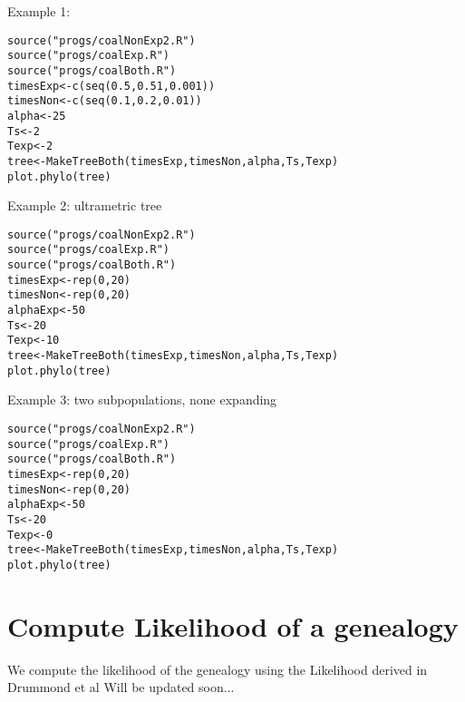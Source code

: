 \documentclass[12pt,a4paper]{article}
\begin{document}
Example 1:

\begin{verbatim}
source("progs/coalNonExp2.R")
source("progs/coalExp.R")
source("progs/coalBoth.R")
timesExp<-c(seq(0.5,0.51,0.001))
timesNon<-c(seq(0.1,0.2,0.01))
alpha<-25
Ts<-2
Texp<-2
tree<-MakeTreeBoth(timesExp,timesNon,alpha,Ts,Texp)
plot.phylo(tree)
\end{verbatim}

Example 2: ultrametric tree

\begin{verbatim}
source("progs/coalNonExp2.R")
source("progs/coalExp.R")
source("progs/coalBoth.R")
timesExp<-rep(0,20)
timesNon<-rep(0,20)
alphaExp<-50
Ts<-20
Texp<-10
tree<-MakeTreeBoth(timesExp,timesNon,alpha,Ts,Texp)
plot.phylo(tree)
\end{verbatim}

Example 3: two subpopulations, none expanding

\begin{verbatim}
source("progs/coalNonExp2.R")
source("progs/coalExp.R")
source("progs/coalBoth.R")
timesExp<-rep(0,20)
timesNon<-rep(0,20)
alphaExp<-50
Ts<-20
Texp<-0
tree<-MakeTreeBoth(timesExp,timesNon,alpha,Ts,Texp)
plot.phylo(tree)
\end{verbatim}


\section{Compute Likelihood of a genealogy}
We compute the likelihood of the genealogy using the Likelihood derived in Drummond et al \cite{}
Will be updated soon...

\end{document}
